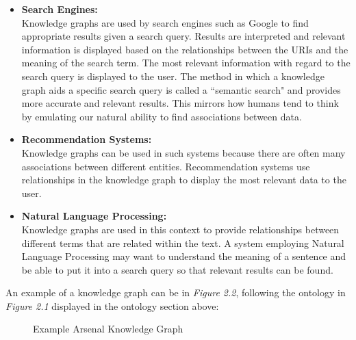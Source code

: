 \vspace{-0.1cm}
\begin{itemize}
    \itemsep0em 
\item \textbf{Search Engines:} \\Knowledge graphs are used by search engines such as Google to find appropriate results given a search query. Results are interpreted and relevant information is displayed based on the relationships between the URIs and the meaning of the search term. The most relevant information with regard to the search query is displayed to the user. The method in which a knowledge graph aids a specific search query is called a ``semantic search" and provides more accurate and relevant results. This mirrors how humans tend to think by emulating our natural ability to find associations between data.  \cite{searchengine}  

\item \textbf{Recommendation Systems:} \\Knowledge graphs can be used in such systems because there are often many associations between different entities. Recommendation systems use relationships in the knowledge graph to display the most relevant data to the user. 

\item \textbf{Natural Language Processing:}\\ Knowledge graphs are used in this context to provide relationships between different terms that are related within the text. A system employing Natural Language Processing may want to understand the meaning of a sentence and be able to put it into a search query so that relevant results can be found. 
\end{itemize}

An example of a knowledge graph can be in \textit{Figure 2.2}, following the ontology in \textit{Figure 2.1} displayed in the ontology section above:

\begin{figure}[H]
\begin{center}
\end{center}
\vspace{-0.4cm}
\caption{Example Arsenal Knowledge Graph}
\end{figure}
\vspace{-0.1cm}

